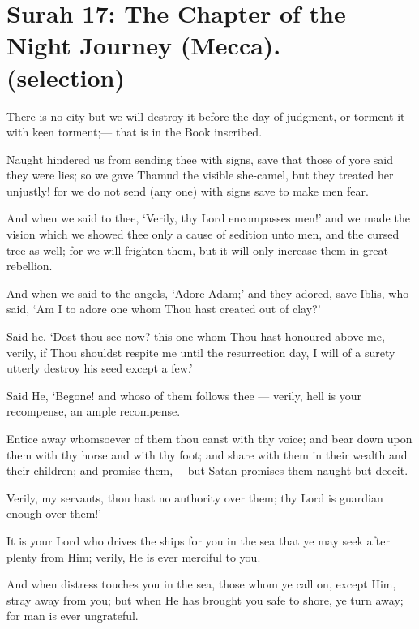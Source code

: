 \documentclass[fontsize=14pt, letterpaper, notitlepage, openany, DIV=12]{scrbook} %
\begin{document}
\section[Surah 17: The Chapter of the Night Journey (Mecca).]{Surah 17: The Chapter of the Night Journey (Mecca).\\ (selection)}


\noindent[17:58]
There is no city but we will destroy it before the day of judgment, or torment it with keen
torment;--- that is in the Book inscribed.

\noindent[17:59]
Naught hindered us from sending thee with signs, save that those of yore said they were
lies; so we gave Thamud the visible she-camel, but they treated her unjustly! for we do not send
(any one) with signs save to make men fear.

\noindent[17:60]
And when we said to thee, `Verily, thy Lord encompasses men!' and we made the vision
which we showed thee only a cause of sedition unto men, and the cursed tree as well; for we will
frighten them, but it will only increase them in great rebellion.

\noindent[17:61]
And when we said to the angels, `Adore Adam;' and they adored, save Iblis, who said,
`Am I to adore one whom Thou hast created out of clay?'

\noindent[17:62]
Said he, `Dost thou see now? this one whom Thou hast honoured above me, verily, if
Thou shouldst respite me until the resurrection day, I will of a surety utterly destroy his seed
except a few.'

\noindent[17:63]
Said He, `Begone! and whoso of them follows thee --- verily, hell is your recompense, an
ample recompense.

\noindent[17:64]
Entice away whomsoever of them thou canst with thy voice; and bear down upon them
with thy horse and with thy foot; and share with them in their wealth and their children; and
promise them,--- but Satan promises them naught but deceit.

\noindent[17:65]
Verily, my servants, thou hast no authority over them; thy Lord is guardian enough over
them!'

\noindent[17:66]
It is your Lord who drives the ships for you in the sea that ye may seek after plenty from
Him; verily, He is ever merciful to you.

\noindent[17:67]
And when distress touches you in the sea, those whom ye call on, except Him, stray away
from you; but when He has brought you safe to shore, ye turn away; for man is ever ungrateful.
\end{document}
